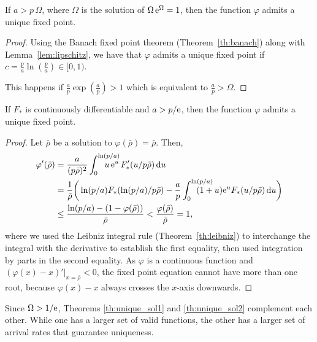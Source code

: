 \begin{theorem} \label{th:unique_sol1}
    If $a > p\,\Omega$, where $\Omega$ is the solution of $\Omega\,\mathrm{e}^\Omega=1$, then the function $\varphi$ admits a unique fixed point.
\end{theorem}
%
\begin{proof}
    Using the Banach fixed point theorem (Theorem~\ref{th:banach}) along with Lemma~\ref{lem:lipschitz}, we have that $\varphi$ admits a unique fixed point if $c = \frac{p}{a}\ln(\frac{p}{a}) \in [0,1)$.
    
    This happens if $\frac{a}{p}\exp(\frac{a}{p}) > 1$ which is equivalent to $\frac{a}{p} > \Omega$.
\end{proof}

\begin{theorem} \label{th:unique_sol2}
    If $F_*$ is continuously differentiable and $a > p/\mathrm{e}$, then the function $\varphi$ admits a unique fixed point.
\end{theorem}
%
\begin{proof}
    Let $\bar\rho$ be a solution to $\varphi(\bar\rho) = \bar\rho$. Then,
    \begin{align*}
        \varphi'(\bar\rho) &= \frac{a}{(p\bar\rho)^2} \int_0^{\ln(p/a)} \hspace{-7mm} u\,\euler^u\,F_*'(u/p \bar\rho)\,\d u \\
            &= \frac{1}{\bar\rho}\bigg( \ln(p/a) F_*(\ln(p/a)/p\bar\rho) - \frac{a}{p}\int_0^{\ln(p/a)}\hspace{-7mm} (1+u) \euler^u F_*(u/p\bar\rho)\,\d u \bigg)\\
            &\le \frac{\ln(p/a) - (1-\varphi(\bar\rho))}{\bar\rho} < \frac{\varphi(\bar\rho)}{\bar\rho} = 1,
    \end{align*}
    where we used the Leibniz integral rule (Theorem~\ref{th:leibniz}) to interchange the integral with the derivative to establish the first equality, then used integration by parts in the second equality.
    As $\varphi$ is a continuous function and $(\varphi(x)-x)'|_{x=\bar\rho} < 0$, the fixed point equation cannot have more than one root, because $\varphi(x)-x$ always crosses the $x$-axis downwards.
\end{proof}

Since $\Omega > 1/\mathrm{e}$, Theorems \ref{th:unique_sol1} and \ref{th:unique_sol2} complement each other. While one has a larger set of valid functions, the other has a larger set of arrival rates that guarantee uniqueness.

